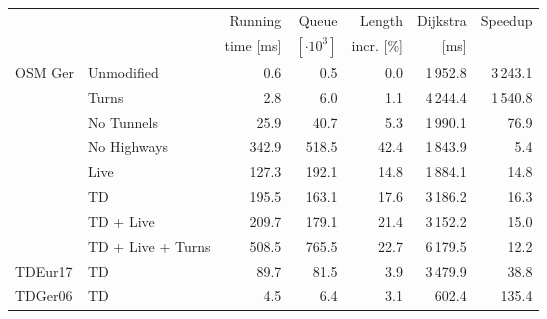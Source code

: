 \begin{tabular}{llrrrrr}
\toprule
 & &   Running &                Queue &     Length & Dijkstra & Speedup \\ & & time [ms] & $[\cdot 10^3]$ & incr. [\%] &     [ms] &         \\
\midrule
OSM Ger & Unmodified &              0.6 &              0.5 &       0.0 &                    1\,952.8 &   3\,243.1 \\
        & Turns &              2.8 &              6.0 &       1.1 &                    4\,244.4 &   1\,540.8 \\
        & No Tunnels &             25.9 &             40.7 &       5.3 &                    1\,990.1 &     76.9 \\
        & No Highways &            342.9 &            518.5 &      42.4 &                    1\,843.9 &      5.4 \\
        & Live &            127.3 &            192.1 &      14.8 &                    1\,884.1 &     14.8 \\
        & TD &            195.5 &            163.1 &      17.6 &                    3\,186.2 &     16.3 \\
        & TD + Live &            209.7 &            179.1 &      21.4 &                    3\,152.2 &     15.0 \\
        & TD + Live + Turns &            508.5 &            765.5 &      22.7 &                    6\,179.5 &     12.2 \\
\addlinespace
TDEur17 & TD &             89.7 &             81.5 &       3.9 &                    3\,479.9 &     38.8 \\
TDGer06 & TD &              4.5 &              6.4 &       3.1 &                     602.4 &    135.4 \\
\bottomrule
\end{tabular}

